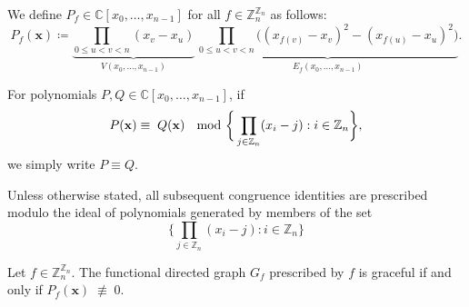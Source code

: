 \begin{defn}\label{defn:polynomial-grace-definition} We define $P_f \in \mathbb{C}[x_0, \ldots, x_{n-1}]$ for all $f \in \mathbb{Z}_n^{\mathbb{Z}_n}$ as follows:
\begin{equation}
    P_f(\mathbf{x}) \coloneq \underbrace{\prod_{0\le u<v<n}(x_{v}-x_{u})}_{V(x_0,\ldots,x_{n-1})}\,\underbrace{\prod_{0\le u<v<n}\big((x_{f(v)}-x_{v})^{2}-(x_{f(u)}-x_{u})^{2}\big)}_{E_f(x_0,\ldots,x_{n-1})}.
\end{equation}
\end{defn}
\begin{defn}\label{defn:polynomial-congruence}
For polynomials $P,Q \in \mathbb{C}[x_0, \ldots, x_{n-1}]$, if
\begin{equation}
P({\bf x}) \equiv \; Q({\bf x}) \; \mod\bigg\{\prod_{j\in\mathbb{Z}_{n}}(x_{i}-j):i\in\mathbb{Z}_{n}\bigg\},
\end{equation}
we simply write $P \equiv Q$.
\end{defn}
 Unless otherwise stated, all subsequent congruence identities are prescribed modulo the ideal of polynomials generated by members of the set
\[
\bigg\{\prod_{j\in\mathbb{Z}_{n}}(x_{i}-j):i\in\mathbb{Z}_{n}\bigg\}
\]
\begin{proposition}\label{prop:polynomial-grace-certificate}
Let $f\in\mathbb{Z}_{n}^{\mathbb{Z}_{n}}$. The functional
directed graph $G_f$ prescribed by $f$ is graceful if and only if $P_f(\mathbf{x}) \; \not\equiv \; 0$.
\end{proposition}
